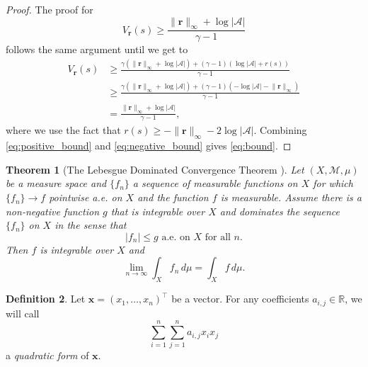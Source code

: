 \documentclass{article}
\newtheorem{theorem}{Theorem}[section]
\theoremstyle{definition}
\newtheorem{definition}[theorem]{Definition}
\theoremstyle{remark}
\newcommand{\rinf}{\lVert \mathbf{r} \rVert_\infty}
\begin{document}
\begin{proof}
  The proof for
  \begin{equation} \label{eq:negative_bound}
    V_{\mathbf{r}}(s) \ge \frac{\rinf + \log|\mathcal{A}|}{\gamma - 1}
  \end{equation}
  follows the same argument until we get to
  \[
    \begin{split}
      V_{\mathbf{r}}(s) &\ge \frac{\gamma(\rinf + \log|\mathcal{A}|) + (\gamma -
        1)(\log|\mathcal{A}| + r(s))}{\gamma - 1} \\
      &\ge \frac{\gamma(\rinf + \log|\mathcal{A}|) + (\gamma -
        1)(-\log|\mathcal{A}| -\rinf)}{\gamma - 1} \\
      &= \frac{\rinf + \log|\mathcal{A}|}{\gamma - 1},
    \end{split}
  \]
  where we use the fact that $r(s) \ge -\rinf - 2\log|\mathcal{A}|$. Combining
  \eqref{eq:positive_bound} and \eqref{eq:negative_bound} gives
  \eqref{eq:bound}.
\end{proof}

\begin{theorem}[The Lebesgue Dominated Convergence Theorem
  \cite{royden2010real}] \label{thm:lebesgue}
  Let $(X, \mathcal{M}, \mu)$ be a measure space and $\{ f_n \}$ a sequence of
  measurable functions on $X$ for which $\{ f_n \} \to f$ pointwise a.e. on $X$
  and the function $f$ is measurable. Assume there is a non-negative function
  $g$ that is integrable over $X$ and dominates the sequence $\{ f_n \}$ on $X$
  in the sense that
  \[
    |f_n| \le g \text{ a.e. on $X$ for all $n$.}
  \]
  Then $f$ is integrable over $X$ and
  \[
    \lim_{n \to \infty} \int_X f_n\,d\mu = \int_X f\,d\mu.
  \]
\end{theorem}

\begin{definition}
  Let $\mathbf{x} = (x_1, \dots, x_n)^\intercal$ be a vector. For any
  coefficients $a_{i,j} \in \mathbb{R}$, we will call
  \[ \sum_{i=1}^n \sum_{j=1}^n a_{i, j}x_ix_j \]
  a \emph{quadratic form} of $\mathbf{x}$.
\end{definition}

\end{document}
